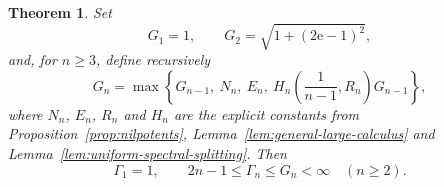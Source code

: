 \documentclass[10pt,a4paper]{amsart}
\newtheorem{theorem}{Theorem}[section]
\begin{document}
\begin{theorem}\label{thm:all-degrees}
Set
\[
       G_1=1,
       \qquad
       G_2=\sqrt{1+(2\mathrm e-1)^2},
\]
and, for \(n\geqslant3\), define recursively
\begin{equation}\label{eq:recursive-upper-bound}
       G_n=\max\left\{
       G_{n-1},\ N_n,\ E_n,\
       H_n\!\left(\frac1{n-1},R_n\right)G_{n-1}
       \right\},
\end{equation}
where \(N_n\), \(E_n\), \(R_n\) and \(H_n\) are the explicit constants
from Proposition~\ref{prop:nilpotents}, Lemma~\ref{lem:general-large-calculus}
and Lemma~\ref{lem:uniform-spectral-splitting}.  Then
\[
       \Gamma_1=1,
       \qquad
       2n-1\leqslant\Gamma_n\leqslant G_n<\infty
       \quad(n\geqslant2).
\]
\end{theorem}
\end{document}
